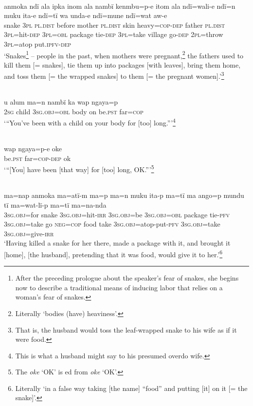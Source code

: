 \newpage

\\
\gll anmoka  ndï  ala      ipka  inom  ala      nambï  kenmbu=p-e itom  ala      ndï=wali-e    ndï=n    muku    ita-e ndï=tï    wa    unda-e  ndï=mune  ndï=wat  aw-e\\
snake    3\textsc{pl}  \textsc{pl.dist}  before  mother  \textsc{pl.dist}  skin  heavy=\textsc{cop}{}-\textsc{dep} father  \textsc{pl.dist}  3\textsc{pl}=hit-\textsc{dep}  3\textsc{pl=obl}  package  tie-\textsc{dep} 3\textsc{pl}=take  village  go-\textsc{dep}  2\textsc{pl}=throw  3\textsc{pl=}atop  put.\textsc{ipfv-dep}\\
\glt ‘Snakes\footnote{After the preceding prologue about the speaker’s fear of snakes, she begins now to describe a traditional means of inducing labor that relies on a woman’s fear of snakes.} -- people in the past, when mothers were pregnant,\footnote{Literally ‘bodies (have) heaviness’.} the fathers used to kill them [= snakes], tie them up into packages [with leaves], bring them home, and toss them [= the wrapped snakes] to them [= the pregnant women].’\footnote{That is, the husband would toss the leaf-wrapped snake to his wife as if it were food.}

\\
\gll u    alum  ma=n      nambï  ka  wap  ngaya=p\\
2\textsc{sg}  child  3\textsc{sg.obj=obl}  body  on  be.\textsc{pst}  far=\textsc{cop}\\
\glt ‘“You’ve been with a child on your body for [too] long.”’\footnote{This is what a husband might say to his presumed overdo wife.}

\\
\gll wap  ngaya=p-e    oke\\
be.\textsc{pst}  far=\textsc{cop}{}-\textsc{dep}  ok\\
\glt ‘“[You] have been [that way] for [too] long, OK.”’\footnote{The  \textit{oke} ‘OK’ is ed from  \textit{oke} ‘OK’.}

\\
\gll ma=nap    anmoka  ma=atï-m      ma=p      ma=n muku    ita-p  ma=tï      ma  ango=p  mundu  tï ma=wat-lï-p        ma=tï    ma=na-nda\\
3\textsc{sg.obj=}for  snake    3\textsc{sg.obj}=hit-\textsc{irr}  \textsc{3sg.obj=}be  3\textsc{sg.obj=obl} package  tie-\textsc{pfv}  3\textsc{sg.obj}=take  go  \textsc{neg=cop}  food  take 3\textsc{sg.obj}=atop-put-\textsc{pfv}  3\textsc{sg.obj}=take  3\textsc{sg.obj}=give-\textsc{irr}\\
\glt ‘Having killed a snake for her there, made a package with it, and brought it [home], [the husband], pretending that it was food, would give it to her.’\footnote{Literally ‘in a false way taking [the name] “food” and putting [it] on it [= the snake]’.}

